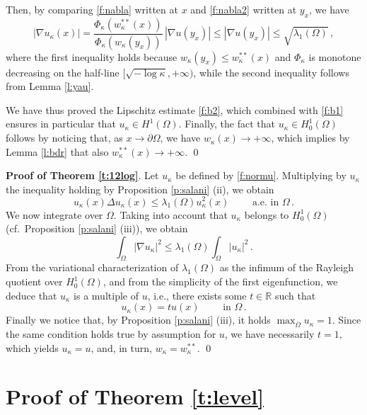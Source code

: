 \documentclass[11pt]{amsart}
\theoremstyle{definition}
\theoremstyle{remark}
\def\R{\mathbb{R}}
\def\Om{\Omega}
\def\k{\kappa}
\begin{document}
Then, by comparing \eqref{f:nabla} written at $x$ and \eqref{f:nabla2} written at $y _x$,   we have 
$$    |\nabla u _\k   (x)   |        = \frac{\Phi  _\k ( w _\k ^ { **}  (x)  )  } {\Phi _\k ( w _\k (y_x)  ) }  \,  |\nabla u   ( y_ x) |  \leq |\nabla u   ( y_ x) | \leq \sqrt {\lambda _ 1 (\Om)}\,,$$
where the first inequality holds because $w _ \k ( y_x) \leq w _\k  ^ {**} (x)$ and  $\Phi _\k$ is monotone decreasing on the half-line  $[\sqrt{ - \log \k} , + \infty)$, while   the second inequality follows from Lemma \ref{l:yau}.  

We have thus proved  the Lipschitz estimate \eqref{f:b2}, which combined with \eqref{f:b1} ensures in particular that $u _\k \in H ^ 1 (\Om)$. Finally, the fact that $u_\k \in H ^ 1 _0 (\Om)$  follows by noticing that, as $x \to \partial \Om$, we have 
 $w _\k  (x) \to + \infty$, which implies by Lemma \ref{l:bdr} that 
also 
$w _\k ^ { **} (x) \to + \infty$.  
   \qed  


 \bigskip
\bigskip\bigskip

{\bf Proof of Theorem \ref{t:12log}}.   Let $ u_\k$ be defined by  \eqref{f:normu}.   Multiplying by $ u_\k $ the inequality holding 
by Proposition \ref{p:salani} (ii), we obtain 
$$  u _\k ( x) \Delta   u_\k  (x) \leq  \lambda _ 1 (\Om )  u _\k  ^2 (x)  \qquad \text{ a.e. in }  \Om\,.$$  
We now integrate over $\Omega$. Taking into account that  $ u_\k$ belongs to $H ^1 _0 (\Om)$ (cf.\ Proposition \ref{p:salani} (iii)), we obtain  
$$\int _\Om |\nabla  u _\k | ^ 2 \leq \lambda _ 1 (\Om) \int _\Om | u_\k | ^ 2 \,.$$
From the variational characterization of $\lambda _ 1 (\Om)$ as the infimum of the Rayleigh quotient over $H ^ 1 _0 (\Om)$, and from the simplicity of the first eigenfunction, we deduce that $u_\k$ is a multiple of $u$, i.e., there exists some $ t \in \R$ such that 
$$ u_\k (x) = t u  (x)   \qquad \text{ in } \Om\,.$$
Finally we notice that, by Proposition \ref{p:salani} (iii), it holds  
$\max _{\overline \Om}  u _ \k   = 1$. Since the same condition holds true by assumption for $u$, 
we have  necessarily $t= 1$, which yields  $ u _\k = u$, and, in turn, $w _\k = w _\k ^ { **}$. 
\qed 

\section{Proof of Theorem \ref{t:level}} \label{sec:proof2} 


 
\end{document}
